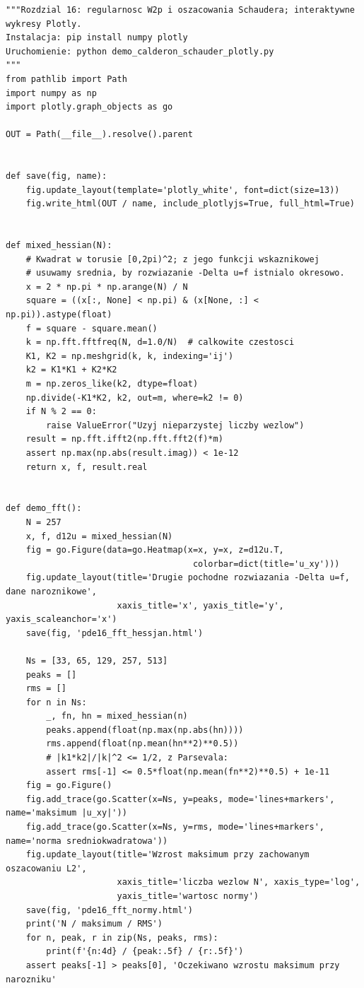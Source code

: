 \begin{lstlisting}[style=pythonpde,caption={Rachunek spektralny dla Hessianu i wykresy ilustrujące oszacowania Schaudera (Plotly)},label={code:pde16-plotly}]
"""Rozdzial 16: regularnosc W2p i oszacowania Schaudera; interaktywne wykresy Plotly.
Instalacja: pip install numpy plotly
Uruchomienie: python demo_calderon_schauder_plotly.py
"""
from pathlib import Path
import numpy as np
import plotly.graph_objects as go

OUT = Path(__file__).resolve().parent


def save(fig, name):
    fig.update_layout(template='plotly_white', font=dict(size=13))
    fig.write_html(OUT / name, include_plotlyjs=True, full_html=True)


def mixed_hessian(N):
    # Kwadrat w torusie [0,2pi)^2; z jego funkcji wskaznikowej
    # usuwamy srednia, by rozwiazanie -Delta u=f istnialo okresowo.
    x = 2 * np.pi * np.arange(N) / N
    square = ((x[:, None] < np.pi) & (x[None, :] < np.pi)).astype(float)
    f = square - square.mean()
    k = np.fft.fftfreq(N, d=1.0/N)  # calkowite czestosci
    K1, K2 = np.meshgrid(k, k, indexing='ij')
    k2 = K1*K1 + K2*K2
    m = np.zeros_like(k2, dtype=float)
    np.divide(-K1*K2, k2, out=m, where=k2 != 0)
    if N % 2 == 0:
        raise ValueError("Uzyj nieparzystej liczby wezlow")
    result = np.fft.ifft2(np.fft.fft2(f)*m)
    assert np.max(np.abs(result.imag)) < 1e-12
    return x, f, result.real


def demo_fft():
    N = 257
    x, f, d12u = mixed_hessian(N)
    fig = go.Figure(data=go.Heatmap(x=x, y=x, z=d12u.T,
                                     colorbar=dict(title='u_xy')))
    fig.update_layout(title='Drugie pochodne rozwiazania -Delta u=f, dane naroznikowe',
                      xaxis_title='x', yaxis_title='y', yaxis_scaleanchor='x')
    save(fig, 'pde16_fft_hessjan.html')

    Ns = [33, 65, 129, 257, 513]
    peaks = []
    rms = []
    for n in Ns:
        _, fn, hn = mixed_hessian(n)
        peaks.append(float(np.max(np.abs(hn))))
        rms.append(float(np.mean(hn**2)**0.5))
        # |k1*k2|/|k|^2 <= 1/2, z Parsevala:
        assert rms[-1] <= 0.5*float(np.mean(fn**2)**0.5) + 1e-11
    fig = go.Figure()
    fig.add_trace(go.Scatter(x=Ns, y=peaks, mode='lines+markers', name='maksimum |u_xy|'))
    fig.add_trace(go.Scatter(x=Ns, y=rms, mode='lines+markers', name='norma sredniokwadratowa'))
    fig.update_layout(title='Wzrost maksimum przy zachowanym oszacowaniu L2',
                      xaxis_title='liczba wezlow N', xaxis_type='log',
                      yaxis_title='wartosc normy')
    save(fig, 'pde16_fft_normy.html')
    print('N / maksimum / RMS')
    for n, peak, r in zip(Ns, peaks, rms):
        print(f'{n:4d} / {peak:.5f} / {r:.5f}')
    assert peaks[-1] > peaks[0], 'Oczekiwano wzrostu maksimum przy narozniku'



\end{lstlisting}
